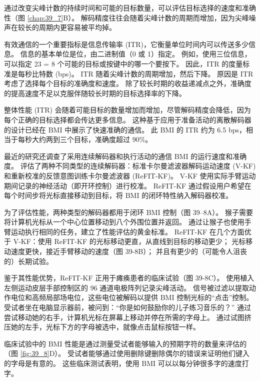 通过改变尖峰计数的持续时间和可能的目标数量，可以评估目标选择的速度和准确性（图 \ref{chap:39_7}B）。 
解码精度往往会随着尖峰计数的周期而增加，因为尖峰噪声在较长的周期内更容易被平均掉。

有效通信的一个重要指标是信息传输率 (ITR)，它衡量单位时间内可以传送多少信息。 
信息的基本单位是位，由二进制值（0 或 1）指定。 
例如，使用三位信息，可以指定 23 = 8 个可能的目标或按键中的哪一个要按下。 
因此，ITR 的度量标准是每秒比特数 (bps)。 
ITR 随着尖峰计数的周期增加，然后下降。 
原因是 ITR 考虑了选择每个目标的准确度和速度。 
除了较长时期的收益递减点之外，准确度的提高速度不足以克服伴随较长时期的目标选择率的下降。


整体性能 (ITR) 会随着可能目标的数量增加而增加，尽管解码精度会降低，因为每个正确的目标选择都会传达更多信息。 
这种基于应用于准备活动的离散解码器的设计已经在 BMI 中展示了快速准确的通信。 
此 BMI 的 ITR 约为 6.5 bps，相当于每秒大约两到三个目标，准确度超过 90\%。


最近的研究还调查了采用连续解码器和执行活动的通信 BMI 的运行速度和准确度。 评估了两种不同类型的连续解码器：标准卡尔曼滤波器解码运动速度 (V-KF) 和重新校准的反馈意图训练卡尔曼滤波器 (ReFIT-KF)。 
V-KF 使用实际手臂运动期间记录的神经活动（即开环控制）进行校准。 
ReFIT-KF 通过假设用户希望在每个时间步将光标直接移动到目标，将 BMI 的闭环特性纳入解码器校准。


为了评估性能，两种类型的解码器都用于闭环 BMI 控制（图 39–8A）。 
猴子需要将计算机光标从一个中心位置移动到八个外围位置并返回。 
通过让猴子也使用手臂运动执行相同的任务，建立了性能评估的黄金标准。 
ReFIT-KF 在几个方面优于 V-KF：使用 ReFIT-KF 的光标移动更直，从直线到目标的移动更少； 光标移动速度更快，接近手臂移动的速度（图 39-8B）； 并且有更少的（可能令人沮丧的）长期试验。


鉴于其性能优势，ReFIT-KF 正用于瘫痪患者的临床试验（图 39-8C）。 
使用植入左侧运动皮层手部控制区的 96 通道电极阵列记录尖峰活动。 
信号被过滤以提取动作电位和高频局部场电位，这些电位被解码以提供 BMI 控制光标的“点击”控制。 
受试者坐在电脑显示器前，被问到：“你是如何鼓励你的儿子练习音乐的？” 通过尝试移动她的右手，计算机光标在屏幕上移动并停在所需的字母上。 
通过试图挤压她的左手，光标下方的字母被选中，就像点击鼠标按钮一样。


临床试验中的 BMI 性能是通过测量受试者能够输入的预期字符的数量来评估的（图 \ref{fig:39_8}D）。 
受试者能够通过使用删除键删除偶尔的错误来证明他们键入的字母是有意的。 
这些临床测试表明，使用 BMI 可以以每分钟很多字的速度打字。

